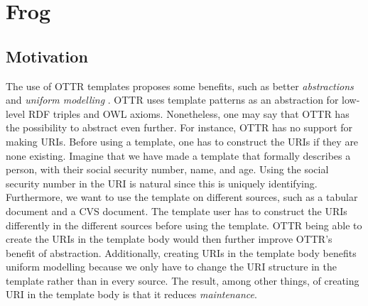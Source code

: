\section{Frog}

\subsection{Motivation}
\label{motivation}
The use of OTTR templates proposes some benefits, such as better \emph{abstractions} \autocite[9]{SLKK_OTTR_2021} and \emph{uniform modelling} \autocite{Lupp_tliam}.  OTTR uses template patterns as an abstraction for low-level RDF triples and OWL axioms. Nonetheless, one may say that OTTR has the possibility to abstract even further. For instance, OTTR has no support for making URIs. Before using a template, one has to construct the URIs if they are none existing. Imagine that we have made a template that formally describes a person, with their social security number, name, and age. Using the social security number in the URI is natural since this is uniquely identifying. Furthermore, we want to use the template on different sources, such as a tabular document and a CVS document. The template user has to construct the URIs differently in the different sources before using the template. OTTR being able to create the URIs in the template body would then further improve OTTR's benefit of abstraction. Additionally, creating URIs in the template body benefits uniform modelling because we only have to change the URI structure in the template rather than in every source. The result, among other things, of creating URI in the template body is that it reduces \emph{maintenance}.

